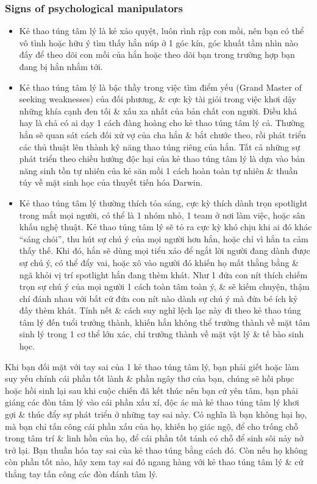 \documentclass[12pt]{article}
\begin{document}
\subsubsection{Signs of psychological manipulators}

\begin{itemize}
	\item Kẻ thao túng tâm lý là kẻ xảo quyệt, luôn rình rập con mồi, nên bạn có thể vô tình hoặc hữu ý tìm thấy hắn núp ở 1 góc kín, góc khuất tầm nhìn nào đấy để theo dõi con mồi của hắn hoặc theo dõi bạn trong trường hợp bạn đang bị hắn nhắm tới.
	\item Kẻ thao túng tâm lý là bậc thầy trong việc tìm điểm yếu (Grand Master of seeking weaknesses) của đối phương, \& cực kỳ tài giỏi trong việc khơi dậy những khía cạnh đen tối \& xấu xa nhất của bản chất con người. Điều khá hay là chả có ai dạy 1 cách đàng hoàng cho kẻ thao túng tâm lý cả. Thường hắn sẽ quan sát cách đối xử vợ của cha hắn \& bắt chước theo, rồi phát triển các thủ thuật lên thành kỹ năng thao túng riêng của hắn. Tất cả những sự phát triển theo chiều hướng độc hại của kẻ thao túng tâm lý là dựa vào bản năng sinh tồn tự nhiên của kẻ săn mồi 1 cách hoàn toàn tự nhiên \& thuần túy về mặt sinh học của thuyết tiến hóa Darwin.
	\item Kẻ thao túng tâm lý thường thích tỏa sáng, cực kỳ thích dành trọn spotlight trong mắt mọi người, có thể là 1 nhóm nhỏ, 1 team ở nơi làm việc, hoặc sân khấu nghệ thuật. Kẻ thao túng tâm lý sẽ tỏ ra cực kỳ khó chịu khi ai đó khác ``sáng chói'', thu hút sự chú ý của mọi người hơn hắn, hoặc chỉ vì hắn ta cảm thấy thế. Khi đó, hắn sẽ dùng mọi tiểu xảo để ngắt lời người đang dành được sự chú ý, có thể đẩy vai, hoặc xô vào người đó khiến họ mất thằng bằng \& ngã khỏi vị trí spotlight hắn đang thèm khát. Như 1 đứa con nít thích chiếm trọn sự chú ý của mọi người 1 cách toàn tâm toàn ý, \& sẽ kiếm chuyện, thậm chí đánh nhau với bất cứ đứa con nít nào dành sự chú ý mà đứa bé ích kỷ đấy thèm khát. Tính nết \& cách suy nghĩ lệch lạc này đi theo kẻ thao túng tâm lý đến tuổi trưởng thành, khiến hắn không thể trưởng thành về mặt tâm sinh lý trong 1 cơ thể lớn xác, chỉ trưởng thành về mặt vật lý \& tế bào sinh học.
\end{itemize}
Khi bạn đối mặt với tay sai của 1 kẻ thao túng tâm lý, bạn phải giết hoặc làm suy yếu chính cái phần tốt lành \& phần ngây thơ của bạn, chúng sẽ hồi phục hoặc hồi sinh lại sau khi cuộc chiến đã kết thúc nên bạn cứ yên tâm, bạn phải giáng các đòn tâm lý vào cái phần xấu xí, độc ác mà kẻ thao túng tâm lý khơi gợi \& thúc đẩy sự phát triển ở những tay sai này. Có nghĩa là bạn không hại họ, mà bạn chỉ tấn công cái phần xấu của họ, khiến họ giác ngộ, để cho trống chỗ trong tâm trí \& linh hồn của họ, để cái phần tốt tánh có chỗ để sinh sôi nảy nở trở lại. Bạn thuần hóa tay sai của kẻ thao túng bằng cách đó. Còn nếu họ không còn phần tốt nào, hãy xem tay sai đó ngang hàng với kẻ thao túng tâm lý \& cứ thẳng tay tấn công các đòn đánh tâm lý.
\end{document}
